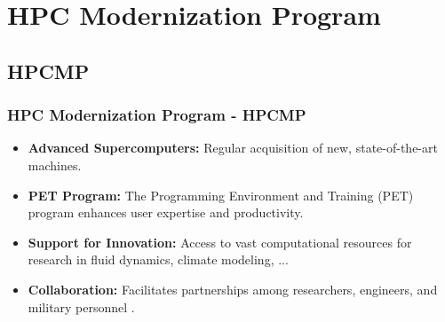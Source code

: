 % 

\section{HPC Modernization Program}

\subsection{HPCMP}

\begin{frame}\frametitle{HPC Modernization Program - HPCMP}
\begin{itemize}
    \item \textbf{Advanced Supercomputers:} Regular acquisition of new, state-of-the-art machines.
    \item \textbf{PET Program:} The Programming Environment and Training (PET) program enhances user expertise and productivity.
    \item \textbf{Support for Innovation:} Access to vast computational resources for research in fluid dynamics, climate modeling, ...
    \item \textbf{Collaboration:} Facilitates partnerships among researchers, engineers, and military personnel .
\end{itemize}
\end{frame}

%

\endinput  %
